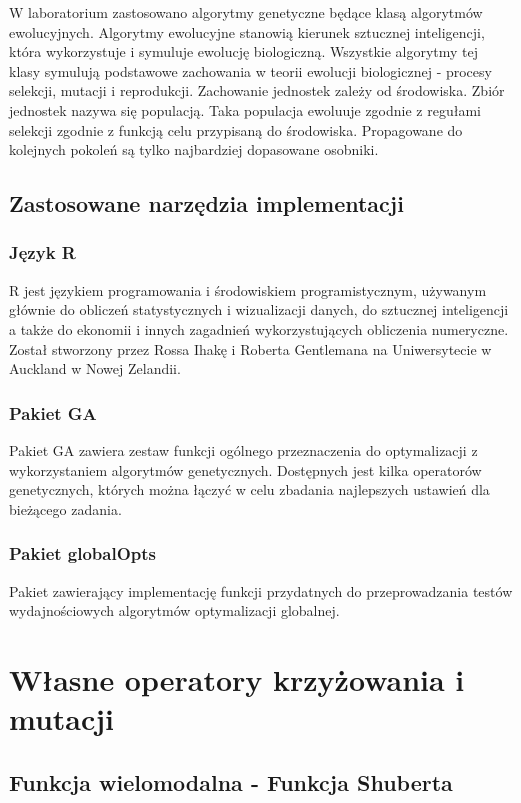 \documentclass{article}
\begin{document}
W laboratorium zastosowano algorytmy genetyczne będące klasą algorytmów ewolucyjnych.
Algorytmy ewolucyjne stanowią kierunek sztucznej inteligencji, która wykorzystuje i symuluje ewolucję biologiczną. Wszystkie algorytmy tej klasy symulują podstawowe zachowania w teorii ewolucji biologicznej - procesy selekcji, mutacji i reprodukcji. Zachowanie jednostek zależy od środowiska. Zbiór jednostek nazywa się populacją. Taka populacja ewoluuje zgodnie z regułami selekcji zgodnie z funkcją celu przypisaną do środowiska. Propagowane do kolejnych pokoleń są tylko najbardziej dopasowane osobniki.


\subsection{Zastosowane narzędzia implementacji}

\subsubsection{Język R}
R jest językiem programowania i środowiskiem programistycznym, używanym głównie do obliczeń statystycznych i wizualizacji danych, do sztucznej inteligencji a także do ekonomii i innych zagadnień wykorzystujących obliczenia numeryczne. Został stworzony przez Rossa Ihakę i Roberta Gentlemana na Uniwersytecie w Auckland w Nowej Zelandii. 


\subsubsection{Pakiet GA}

Pakiet GA zawiera zestaw funkcji ogólnego przeznaczenia do optymalizacji z wykorzystaniem algorytmów genetycznych. Dostępnych jest kilka operatorów genetycznych, których można łączyć w celu zbadania najlepszych ustawień dla bieżącego zadania.


\subsubsection{Pakiet globalOpts}
Pakiet zawierający implementację funkcji przydatnych do przeprowadzania testów wydajnościowych algorytmów optymalizacji globalnej.

\newpage
\section{Własne operatory krzyżowania i mutacji}
\subsection{Funkcja wielomodalna - Funkcja Shuberta}
\end{document}
